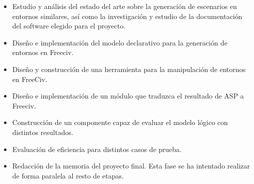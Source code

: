\begin{itemize}
	\item Estudio y análisis del estado del arte sobre la generación de escenarios en entornos similares, así como la investigación y estudio de la documentación del software elegido para el proyecto. 
	\item Diseño e implementación del modelo declarativo para la generación de entornos en Freeciv.
	\item Diseño y construcción de una herramienta para la manipulación de entornos en FreeCiv.
	\item Diseño e implementación de un módulo que traduzca el resultado de ASP a Freeciv.
	\item Construcción de un componente capaz de evaluar el modelo lógico con distintos resultados.
	\item Evaluación de eficiencia para distintos casos de prueba.
	\item Redacción de la memoria del proyecto final. Esta fase se ha intentado realizar de forma paralela al resto de etapas.
\end{itemize}